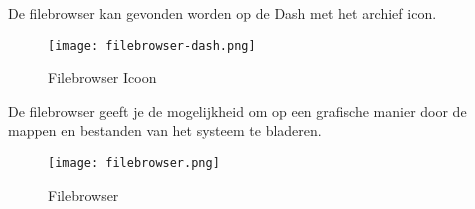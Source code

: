 De filebrowser kan gevonden worden op de Dash met het archief icon.
\begin{figure}[H]
	\centering
\texttt{[image: filebrowser-dash.png]}
	\caption{Filebrowser Icoon}
	\label{fig:de_filebrowser_icon}
\end{figure}

De filebrowser geeft je de mogelijkheid om op een grafische manier door de mappen en bestanden van het systeem te bladeren.
\begin{center}
\begin{figure}[H]
\texttt{[image: filebrowser.png]}
	\caption{Filebrowser}
	\label{fig:de_filebrowser}
\end{figure}
\end{center}


